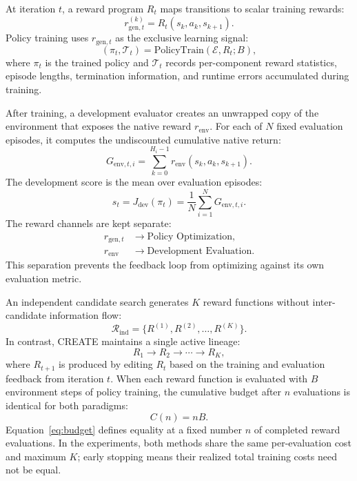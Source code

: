 \documentclass[letterpaper,twocolumn,10pt]{article}
\begin{document}
At iteration $t$, a reward program $R_t$ maps transitions to scalar training rewards:
\begin{equation}
r_{\text{gen},t}^{(k)} = R_t(s_k, a_k, s_{k+1}).
\label{eq:gen_reward}
\end{equation}
Policy training uses $r_{\text{gen},t}$ as the exclusive learning signal:
\begin{equation}
(\pi_t, \mathcal{T}_t) = \text{PolicyTrain}(\mathcal{E}, R_t; B),
\label{eq:policy_train}
\end{equation}
where $\pi_t$ is the trained policy and $\mathcal{T}_t$ records per-component reward statistics, episode lengths, termination information, and runtime errors accumulated during training.

After training, a development evaluator creates an unwrapped copy of the environment that exposes the native reward $r_{\text{env}}$. For each of $N$ fixed evaluation episodes, it computes the undiscounted cumulative native return:
\begin{equation}
G_{\text{env},t,i} = \sum_{k=0}^{H_i-1} r_{\text{env}}(s_k, a_k, s_{k+1}).
\label{eq:dev_return}
\end{equation}
The development score is the mean over evaluation episodes:
\begin{equation}
s_t = J_{\text{dev}}(\pi_t) = \frac{1}{N}\sum_{i=1}^{N} G_{\text{env},t,i}.
\label{eq:dev_score}
\end{equation}
The reward channels are kept separate:
\begin{equation}
\begin{aligned}
r_{\text{gen},t} &\rightarrow \text{Policy Optimization},\\
r_{\text{env}} &\rightarrow \text{Development Evaluation}.
\end{aligned}
\label{eq:dual_channel}
\end{equation}
This separation prevents the feedback loop from optimizing against its own evaluation metric.

An independent candidate search generates $K$ reward functions without inter-candidate information flow:
\begin{equation}
\mathcal{R}_{\text{ind}} = \{R^{(1)}, R^{(2)}, \ldots, R^{(K)}\}.
\label{eq:ind_search}
\end{equation}
In contrast, CREATE maintains a single active lineage:
\begin{equation}
R_1 \rightarrow R_2 \rightarrow \cdots \rightarrow R_K,
\label{eq:seq_path}
\end{equation}
where $R_{t+1}$ is produced by editing $R_t$ based on the training and evaluation feedback from iteration $t$. When each reward function is evaluated with $B$ environment steps of policy training, the cumulative budget after $n$ evaluations is identical for both paradigms:
\begin{equation}
C(n) = nB.
\label{eq:budget}
\end{equation}
Equation~\ref{eq:budget} defines equality at a fixed number $n$ of completed reward evaluations. In the experiments, both methods share the same per-evaluation cost and maximum $K$; early stopping means their realized total training costs need not be equal.
\end{document}
